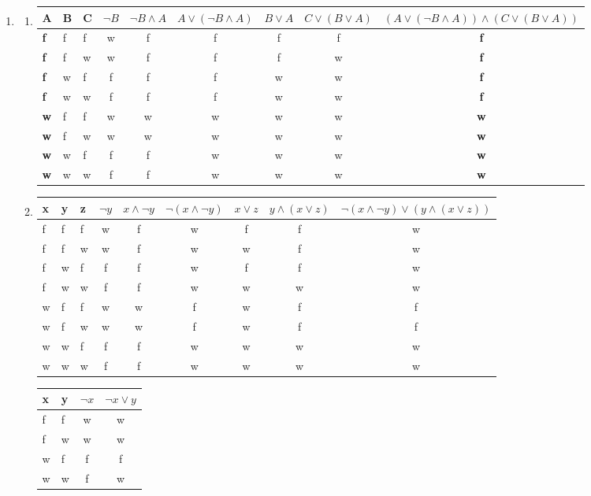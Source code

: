 \documentclass[a4paper]{article}
\begin{document}
\begin{enumerate}
		\item
		\begin{enumerate}
			\item
			\begin{tabular}{|l|l|l|c|c|c|c|c|c|}
				\firsthline
				A & B & C & $\lnot B$ & $\lnot B \land A$ & $A \lor (\lnot B \land A)$ & $B \lor A$ & $C \lor (B \lor A)$ & $(A \lor (\lnot B \land A)) \land (C \lor (B \lor A))$ \\
				\hline
				\textbf{f} & f & f & w & f & f & f & f & \textbf{f} \\
				\textbf{f} & f & w & w & f & f & f & w & \textbf{f} \\
				\textbf{f} & w & f & f & f & f & w & w & \textbf{f} \\
				\textbf{f} & w & w & f & f & f & w & w & \textbf{f} \\
				\textbf{w} & f & f & w & w & w & w & w & \textbf{w} \\
				\textbf{w} & f & w & w & w & w & w & w & \textbf{w} \\
				\textbf{w} & w & f & f & f & w & w & w & \textbf{w} \\
				\textbf{w} & w & w & f & f & w & w & w & \textbf{w} \\
				\hline
			\end{tabular}
		
			\item
			\begin{tabular}{|l|l|l|c|c|c|c|c|c|}
				\firsthline
				x & y & z & $\lnot y$ & $x \land \lnot y$ & $\lnot (x \land \lnot y)$ & $x \lor z$ & $y \land (x \lor z)$ & $\lnot (x \land \lnot y) \lor (y \land (x \lor z))$ \\
				\hline
					f & f & f & w & f & w & f & f & w \\
					f & f & w & w & f & w & w & f & w \\
					f & w & f & f & f & w & f & f & w \\
					f & w & w & f & f & w & w & w & w \\
					w & f & f & w & w & f & w & f & f \\
					w & f & w & w & w & f & w & f & f \\
					w & w & f & f & f & w & w & w & w \\
					w & w & w & f & f & w & w & w & w \\
				\hline			
			\end{tabular}
			
			\begin{tabular}{|l|l|c|c|}
				\firsthline
					x & y & $\lnot x$ & $\lnot x \lor y$ \\				 
				\hline
					f & f & w & w \\
					f & w & w & w \\
					w & f & f & f \\
					w & w & f & w \\
				\hline
			\end{tabular}
			

\end{enumerate}
\end{enumerate}
\end{document}
